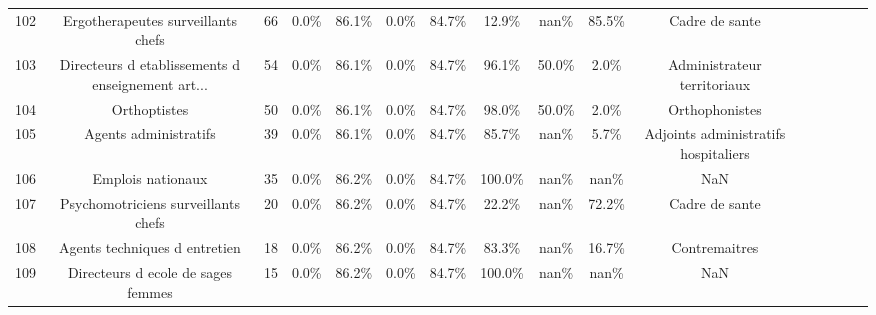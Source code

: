 \documentclass[10pt]{article}
\begin{document}
\begin{landscape}
\begin{longtable}{ | p{0.5cm} |*{15}{c|} }
102 &                 Ergotherapeutes surveillants chefs &             66 &           0.0\% &                  86.1\% &                 0.0\% &                    84.7\% &              12.9\% &                              nan\% &                                    85.5\% &                                     Cadre de sante \\
103 &  Directeurs d etablissements d enseignement art... &             54 &           0.0\% &                  86.1\% &                 0.0\% &                    84.7\% &              96.1\% &                             50.0\% &                                     2.0\% &                        Administrateur territoriaux \\
104 &                                       Orthoptistes &             50 &           0.0\% &                  86.1\% &                 0.0\% &                    84.7\% &              98.0\% &                             50.0\% &                                     2.0\% &                                     Orthophonistes \\
105 &                              Agents administratifs &             39 &           0.0\% &                  86.1\% &                 0.0\% &                    84.7\% &              85.7\% &                              nan\% &                                     5.7\% &               Adjoints administratifs hospitaliers \\
106 &                                  Emplois nationaux &             35 &           0.0\% &                  86.2\% &                 0.0\% &                    84.7\% &             100.0\% &                              nan\% &                                     nan\% &                                                NaN \\
107 &                Psychomotriciens surveillants chefs &             20 &           0.0\% &                  86.2\% &                 0.0\% &                    84.7\% &              22.2\% &                              nan\% &                                    72.2\% &                                     Cadre de sante \\
108 &                      Agents techniques d entretien &             18 &           0.0\% &                  86.2\% &                 0.0\% &                    84.7\% &              83.3\% &                              nan\% &                                    16.7\% &                                      Contremaitres \\
109 &                 Directeurs d ecole de sages femmes &             15 &           0.0\% &                  86.2\% &                 0.0\% &                    84.7\% &             100.0\% &                              nan\% &                                     nan\% &                                                NaN \\

\end{longtable}
\end{landscape}
\end{document}
